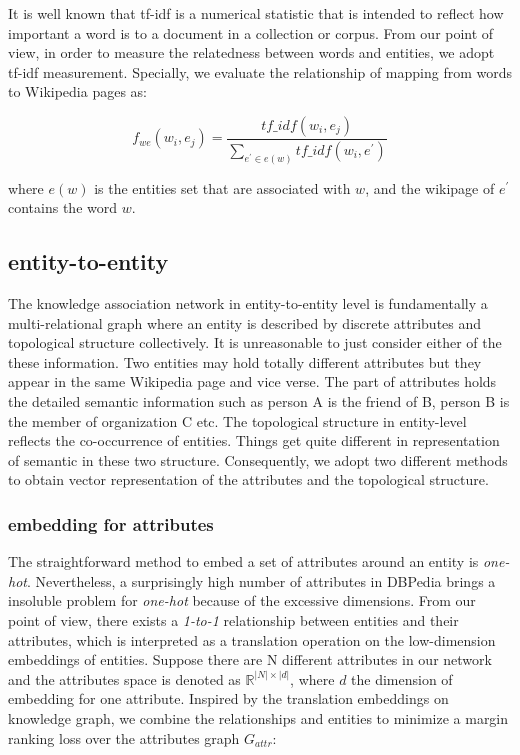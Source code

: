 It is well known that tf-idf is a numerical statistic that is intended to reflect how important a word is to a document
in a collection or corpus. From our point of view, in order to measure the relatedness between words and entities,
we adopt tf-idf measurement. Specially, we evaluate the relationship of mapping from words to Wikipedia pages as:

\begin{small}
    \begin{equation}
        \label{tfidf}
        f_{we}(w_i, e_j) = \frac{tf\_idf(w_i,e_j)}{\sum_{e^{'} \in e(w)}^{ }tf\_idf(w_i,e^{'})}
    \end{equation}
\end{small}where $e(w)$ is the entities set that are associated with $w$, and the wikipage of $e^{'}$ contains the word $w$.

\subsection{entity-to-entity}
The knowledge association network in entity-to-entity level is fundamentally a multi-relational graph
where an entity is described by discrete attributes and topological structure collectively.
It is unreasonable to just consider either of the these information. Two entities may hold totally different
attributes but they appear in the same Wikipedia page and vice verse. 
The part of attributes holds the detailed semantic information such as person A is the friend of B,
person B is the member of organization C etc. The topological structure in entity-level reflects the co-occurrence
of entities. Things get quite different in representation of semantic in these two structure. 
Consequently, we adopt two different methods to obtain vector representation of the attributes and the topological structure.

\subsubsection{embedding for attributes}
The straightforward method to embed a set of attributes around an entity is \emph{one-hot}. Nevertheless, a surprisingly
high number of attributes in DBPedia brings a insoluble problem for \emph{one-hot} because of the excessive dimensions.
From our point of view, there exists a \emph{1-to-1} relationship between entities and their attributes, which is
interpreted as a translation operation on the low-dimension embeddings of entities\cite{nips/BordesUGWY13,corr/Ledell17}.
Suppose there are $\mathrm{N}$ different attributes in our network and the attributes space is denoted as
$\mathbb{R} ^ {|N| \times |d|}$, where $d$ the dimension of embedding for one attribute.
Inspired by the translation embeddings on knowledge graph, we combine the relationships and entities to minimize
a margin ranking loss over the attributes graph $G_{attr}$:

